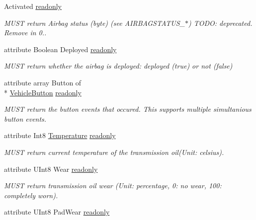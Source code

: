 \begin{DoxyCompactItemize}
Activated \hyperlink{interfaceVehiclePropertyType_a85640ae0f23f03d2f35b9d8a3040f1d2}{readonly}
\begin{DoxyCompactList}\small\item\em M\+U\+S\+T return Airbag status (byte) (see A\+I\+R\+B\+A\+G\+S\+T\+A\+T\+U\+S\+\_\+$\ast$) T\+O\+D\+O\+: deprecated. Remove in 0.. \end{DoxyCompactList}\item 
\hypertarget{interfaceVehiclePropertyType_a659d2f71ad3a6b3f3bb23c4f33b72303}{attribute Boolean Deployed \hyperlink{interfaceVehiclePropertyType_a659d2f71ad3a6b3f3bb23c4f33b72303}{readonly}}\label{interfaceVehiclePropertyType_a659d2f71ad3a6b3f3bb23c4f33b72303}

\begin{DoxyCompactList}\small\item\em M\+U\+S\+T return whether the airbag is deployed\+: deployed (true) or not (false) \end{DoxyCompactList}\item 
\hypertarget{interfaceVehiclePropertyType_ac5655479847c7576c1ddda2089c43b94}{attribute array Button of \\*
\hyperlink{interfaceVehicleButton}{Vehicle\+Button} \hyperlink{interfaceVehiclePropertyType_ac5655479847c7576c1ddda2089c43b94}{readonly}}\label{interfaceVehiclePropertyType_ac5655479847c7576c1ddda2089c43b94}

\begin{DoxyCompactList}\small\item\em M\+U\+S\+T return the button events that occured. This supports multiple simultanious button events. \end{DoxyCompactList}\item 
\hypertarget{interfaceVehiclePropertyType_a9d93648a9559b5b7331ff185135c22af}{attribute Int8 \hyperlink{interfaceTemperature}{Temperature} \hyperlink{interfaceVehiclePropertyType_a9d93648a9559b5b7331ff185135c22af}{readonly}}\label{interfaceVehiclePropertyType_a9d93648a9559b5b7331ff185135c22af}

\begin{DoxyCompactList}\small\item\em M\+U\+S\+T return current temperature of the transmission oil(\+Unit\+: celsius). \end{DoxyCompactList}\item 
attribute U\+Int8 Wear \hyperlink{interfaceVehiclePropertyType_ae88854adacffc7b96a8afca00d2e6407}{readonly}
\begin{DoxyCompactList}\small\item\em M\+U\+S\+T return transmission oil wear (Unit\+: percentage, 0\+: no wear, 100\+: completely worn). \end{DoxyCompactList}\item 
\hypertarget{interfaceVehiclePropertyType_a0e6fc7ea97a7950f618955fe7c1f8d28}{attribute U\+Int8 Pad\+Wear \hyperlink{interfaceVehiclePropertyType_a0e6fc7ea97a7950f618955fe7c1f8d28}{readonly}}\label{interfaceVehiclePropertyType_a0e6fc7ea97a7950f618955fe7c1f8d28}


\end{DoxyCompactItemize}
